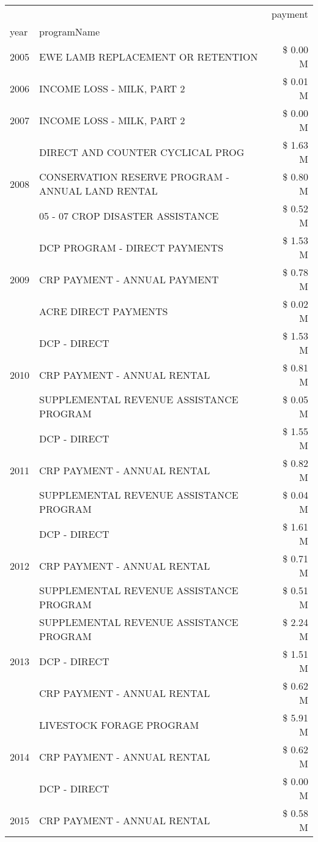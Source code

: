 \begin{tabular}{llr}
\toprule
 &  & payment \\
year & programName &  \\
\midrule
2005 & EWE LAMB REPLACEMENT OR RETENTION & \$ 0.00 M \\
\cline{1-3}
2006 & INCOME LOSS - MILK, PART 2 & \$ 0.01 M \\
\cline{1-3}
2007 & INCOME LOSS - MILK, PART 2 & \$ 0.00 M \\
\cline{1-3}
\multirow[t]{3}{*}{2008} & DIRECT AND COUNTER CYCLICAL PROG & \$ 1.63 M \\
 & CONSERVATION RESERVE PROGRAM - ANNUAL LAND RENTAL & \$ 0.80 M \\
 & 05 - 07 CROP DISASTER ASSISTANCE & \$ 0.52 M \\
\cline{1-3}
\multirow[t]{3}{*}{2009} & DCP PROGRAM - DIRECT PAYMENTS & \$ 1.53 M \\
 & CRP PAYMENT - ANNUAL PAYMENT & \$ 0.78 M \\
 & ACRE DIRECT PAYMENTS & \$ 0.02 M \\
\cline{1-3}
\multirow[t]{3}{*}{2010} & DCP - DIRECT & \$ 1.53 M \\
 & CRP PAYMENT - ANNUAL RENTAL & \$ 0.81 M \\
 & SUPPLEMENTAL REVENUE ASSISTANCE PROGRAM & \$ 0.05 M \\
\cline{1-3}
\multirow[t]{3}{*}{2011} & DCP - DIRECT & \$ 1.55 M \\
 & CRP PAYMENT - ANNUAL RENTAL & \$ 0.82 M \\
 & SUPPLEMENTAL REVENUE ASSISTANCE PROGRAM & \$ 0.04 M \\
\cline{1-3}
\multirow[t]{3}{*}{2012} & DCP - DIRECT & \$ 1.61 M \\
 & CRP PAYMENT - ANNUAL RENTAL & \$ 0.71 M \\
 & SUPPLEMENTAL REVENUE ASSISTANCE PROGRAM & \$ 0.51 M \\
\cline{1-3}
\multirow[t]{3}{*}{2013} & SUPPLEMENTAL REVENUE ASSISTANCE PROGRAM & \$ 2.24 M \\
 & DCP - DIRECT & \$ 1.51 M \\
 & CRP PAYMENT - ANNUAL RENTAL & \$ 0.62 M \\
\cline{1-3}
\multirow[t]{3}{*}{2014} & LIVESTOCK FORAGE PROGRAM & \$ 5.91 M \\
 & CRP PAYMENT - ANNUAL RENTAL & \$ 0.62 M \\
 & DCP - DIRECT & \$ 0.00 M \\
\cline{1-3}
\multirow[t]{3}{*}{2015} & CRP PAYMENT - ANNUAL RENTAL & \$ 0.58 M \\

\end{tabular}
